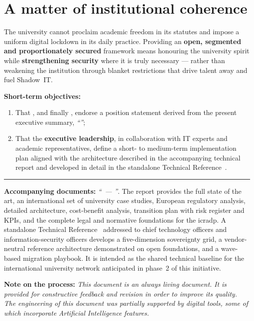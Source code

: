 
\section{A matter of institutional coherence}

\begin{actionbox}
The university cannot proclaim academic freedom in its statutes and impose
a uniform digital lockdown in its daily practice. Providing an
\textbf{open, segmented and proportionately secured} framework means
honouring the university spirit while \textbf{strengthening security}
where it is truly necessary --- rather than weakening the institution
through blanket restrictions that drive talent away and fuel Shadow~IT.

\medskip
\textbf{Short-term objectives:}
\begin{enumerate}
  \item That \textbf{}, and finally
    \textbf{}, endorse a position statement derived
    from the present executive summary, \emph{``\suitpolicytitle''};
  \item That the \textbf{executive leadership}, in collaboration with IT
    experts and academic representatives, define a short- to
    medium-term implementation plan aligned with the architecture
    described in the accompanying technical report and developed
    in detail in the standalone Technical Reference~\cite{ng-tech-ref-2026}.
\end{enumerate}
\end{actionbox}

\vfill

\noindent\rule{\textwidth}{0.4pt}

{\footnotesize\textbf{Accompanying documents:} \emph{``\suitpolicytitle\ --- \suitpolicysubtitle''}. The report provides the full state of the art, an international set of
university case studies, European regulatory analysis, detailed
architecture, cost-benefit analysis, transition plan with risk register and
KPIs, and the complete legal and normative foundations for the \gls{icradp}.
A standalone Technical Reference~\cite{ng-tech-ref-2026} addressed to
chief technology officers and information-security officers develops
a five-dimension sovereignty grid, a vendor-neutral reference
architecture demonstrated on open foundations, and a wave-based
migration playbook. It is intended as the shared technical baseline
for the international university network anticipated in phase~2 of
this initiative.}

\smallskip

{\footnotesize\textbf{Note on the process:}
\textit{This document is an always living document.
It is provided for constructive feedback and revision in order to improve its quality.
The engineering of this document was partially supported by digital tools, some of which incorporate Artificial Intelligence features.}}
